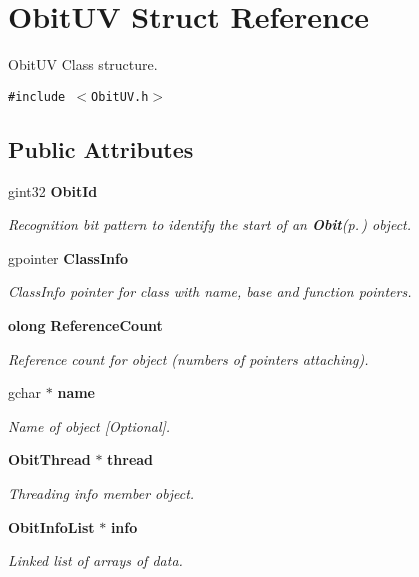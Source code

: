 \section{Obit\-UV Struct Reference}
\label{structObitUV}
Obit\-UV Class structure.  


{\tt \#include $<$Obit\-UV.h$>$}

\subsection*{Public Attributes}
\begin{CompactItemize}
\item 
gint32 {\bf Obit\-Id}
\begin{CompactList}\small\item\em Recognition bit pattern to identify the start of an {\bf Obit}{\rm (p.\,\pageref{structObit})} object. \item\end{CompactList}\item 
gpointer {\bf Class\-Info}
\begin{CompactList}\small\item\em Class\-Info pointer for class with name, base and function pointers. \item\end{CompactList}\item 
{\bf olong} {\bf Reference\-Count}
\begin{CompactList}\small\item\em Reference count for object (numbers of pointers attaching). \item\end{CompactList}\item 
gchar $\ast$ {\bf name}
\begin{CompactList}\small\item\em Name of object [Optional]. \item\end{CompactList}\item 
{\bf Obit\-Thread} $\ast$ {\bf thread}
\begin{CompactList}\small\item\em Threading info member object. \item\end{CompactList}\item 
{\bf Obit\-Info\-List} $\ast$ {\bf info}
\begin{CompactList}\small\item\em Linked list of arrays of data. \item\end{CompactList}\item 

\end{CompactItemize}
